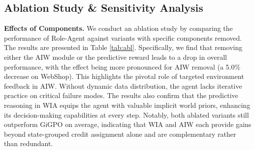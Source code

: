 \documentclass{llmxive}
\providecommand{\arraystretch}{1}
\begin{document}
\subsection{Ablation Study \& Sensitivity Analysis}\label{assa}
\noindent\textbf{Effects of Components.} We conduct an ablation study by comparing the performance of Role-Agent against variants with specific components removed. The results are presented in Table \ref{tab:abl}. Specifically, we find that removing either the AIW  module or the predictive reward leads to a drop in overall performance, with the effect being more pronounced for AIW removal (a 5.0\% decrease on WebShop). This highlights the pivotal role of targeted environment feedback in AIW. Without dynamic data distribution, the agent lacks iterative practice on critical failure modes. The results also confirm that the predictive reasoning in WIA equips the agent with valuable implicit world priors, enhancing its decision-making capabilities at every step. Notably, both ablated variants still outperform GiGPO on average, indicating that WIA and AIW each provide gains beyond state-grouped credit assignment alone and are complementary rather than redundant. 

 


\begin{table}[t]
\begin{center} 
\vspace{-0.2cm}
\renewcommand{\arraystretch}{1}   
\setlength\tabcolsep{7pt} 
\end{center}
\vspace{-0.4cm}
\caption{Sensitivity Analysis of hyper-parameters with Qwen2.5-1.5B-Instruct. ($H\ge1$ and is rounded).}\label{tab:sense} 
\vspace{-0.5cm}
\end{table}
\end{document}
